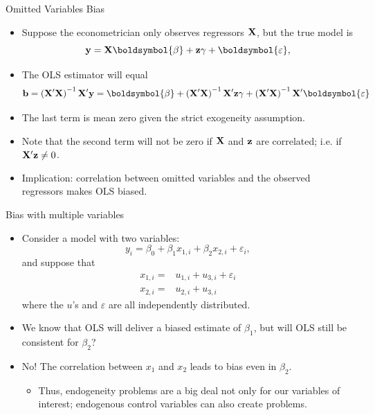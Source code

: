 \documentclass[aspectratio=169,11pt]{beamer}
\begin{document}
\begin{frame}{Omitted Variables Bias}
\begin{itemize}
	\item Suppose the econometrician only observes regressors ${\bf X} $, but the true model is\[
			{\bf y}= {\bf X} \boldsymbol{\beta} + {\bf z} \gamma + \boldsymbol{\varepsilon},
	\]

	\item The OLS estimator will equal\[
	{\bf b} = \left({\bf X}'{\bf X}\right)^{-1} {\bf X}' {\bf y} = \boldsymbol{\beta}  + \left({\bf X}'{\bf X}\right)^{-1} {\bf X}' {\bf z} \gamma + \left({\bf X}'{\bf X}\right)^{-1} {\bf X}' \boldsymbol{\varepsilon}
	\]

	\item The last term is mean zero given the strict exogeneity assumption.

	\item Note that the second term will not be zero if ${\bf X}$ and ${\bf z}$ are correlated;
	i.e. if $ {\bf X}' {\bf z} \ne 0$.

	\item Implication:  correlation between omitted variables and the observed regressors makes OLS biased.

	
\end{itemize}
\end{frame}







\begin{frame}{Bias with multiple variables}
\begin{itemize}
		\item<1-> Consider a model with two variables:\[
			y_i = \beta_0 + \beta_1 x_{1,i} + \beta_2 x_{2,i} + \varepsilon_i,
		\]
		and suppose that
		\begin{align*}
			x_{1,i} =& u_{1,i} + u_{3,i} + \varepsilon_i  \\
			x_{2,i} =& u_{2,i} + u_{3,i}
		\end{align*}		
		where the $u$'s and $\varepsilon$ are all independently distributed. 
		
		\item<1-> We know that OLS will deliver
		a biased estimate of $\beta_{1}$, but will OLS still be consistent for $\beta_2$?
		
		\medskip
		\item<2-> No! The correlation between $x_1$ and $x_2$ leads to bias even
		in $\beta_2$.
		\begin{itemize}
			\item<2-> Thus, endogeneity problems are a big deal not only for our variables of interest; endogenous
			control variables can also create problems.
		\end{itemize}
\end{itemize}
\end{frame}
\end{document}
